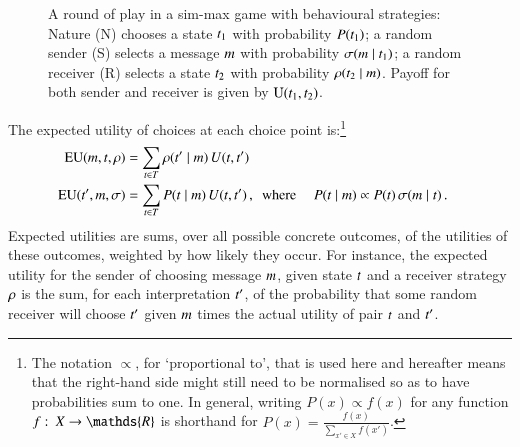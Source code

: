 \documentclass[12pt,english]{article}
\newcommand{\similarity}{\ensuremath{\mathrm{Sim}}} %
\renewcommand{\Pr}{\ensuremath{P}}
\numberwithin{equation}{section}
\begin{document}
\begin{figure}
  \centering


  \caption{A round of play in a sim-max game with behavioural strategies: Nature (N) chooses a
    state $t_{\mathrm{1}}$ with probability $\Pr(\mystate{1})$; a random sender (S) selects a
    message $m$ with probability $\sigma(m \mid t_{\mathrm{1}})$; a random receiver
    (R) selects a state $t_{\mathrm{2}}$ with probability $\rho(t_{\mathrm{2}} \mid m)$.
    Payoff for both sender and receiver is given by $\mathrm{U}(t_{\mathrm{1}}, t_{\mathrm{2}})$.}
  \label{fig:sim-max-illustration}
\end{figure}

The expected utility of choices at each choice point is:\footnote{The notation
  $\propto$, for `proportional to', that is used here and hereafter means that the right-hand
  side might still need to be normalised so as to have probabilities sum to one. In general,
  writing $P(x) \propto f(x)$ for any function $f \mycolon X \rightarrow \mathds{R}$ is
  shorthand for $P(x) = \frac{f(x)}{\sum_{x' \in X} f(x')}$. }
\begin{align*}
  \EU(\messg, \state, \Rstrat) & = \sum_{\state \in \States}
  \Rstrat(\state' \probbar \messg) \myts U(\state, \state') \\
  \EU(\state', \messg, \Sstrat) & = \sum_{\state \in
    \States} P(\state \probbar \messg)  \myts
  U(\state, \state')\,, \text{\ \  where } &
P(\state \probbar \messg) & \propto \Pr(\state) \myts \Sstrat(\messg \probbar \state) \,.
\end{align*}
Expected utilities are sums, over all possible concrete outcomes, of the utilities of these
outcomes, weighted by how likely they occur. For instance, the expected utility for the sender
of choosing message $m$, given state $t$ and a receiver strategy $\rho$ is the
sum, for each interpretation $t'$, of the probability that some random receiver will
choose $t'$ given $m$ times the actual utility of pair $t$ and
$t'$.
\end{document}

